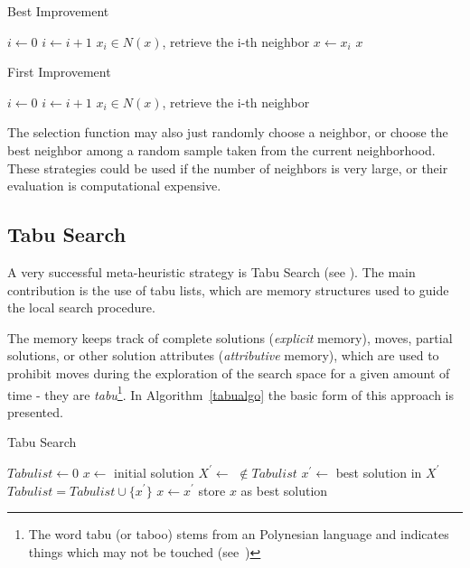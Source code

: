 \begin{algorithm}
\caption{Best Improvement}
\label{bestimprov}
\begin{algorithmic}[1] 
\State $i \gets 0$
\Repeat
\State $i \gets i+1$
\State $x_i \in N(x)$, retrieve the i-th neighbor
    \State $x \gets x_i$
\EndIf
{}
\State \Return $x$
\EndFunction
\end{algorithmic}
\end{algorithm}

\begin{algorithm}
\caption{First Improvement}
\label{firstimprov}
\begin{algorithmic}[1] 
\State $i \gets 0$
\Repeat
\State $i \gets i+1$
\State $x_i \in N(x)$, retrieve the i-th neighbor
\State \Return {}
\EndFunction
\end{algorithmic}
\end{algorithm}

The selection function may also just randomly choose a neighbor, or choose the best neighbor among a random sample taken from the current neighborhood. These strategies could be used if the number of neighbors is very large, or their evaluation is computational expensive.

\subsection{Tabu Search} \label{sec:tabu}
A very successful meta-heuristic strategy is Tabu Search (see \cite{glover1988tabu}). 
The main contribution is the use of tabu lists, which are memory structures used to guide the local search procedure. 

The memory keeps track of complete solutions (\emph{explicit} memory), moves, partial solutions, or other solution attributes (\emph{attributive} memory), which are used to prohibit moves during the exploration of the search space for a given amount of time - they are \emph{tabu}\footnote{The word tabu (or taboo) stems from an Polynesian language and indicates things which may not be touched (see~\cite{glover1997tabu})}. In Algorithm~\ref{tabualgo} the basic form of this approach is presented. 

\begin{algorithm}
\caption{Tabu Search}
\label{tabualgo}
\begin{algorithmic}[1]
\State $Tabulist \gets 0$
\State $x\gets$ initial solution
\Repeat
 \State $X^\prime \gets$  $\not\in Tabulist$
 \State $x^\prime \gets$ best solution in $X^\prime$
 \State $Tabulist = Tabulist \cup \{x^\prime\}$
 \State $x \gets x^\prime$
   \State store $x$ as best solution
 \EndIf
{}
\end{algorithmic}
\end{algorithm}

